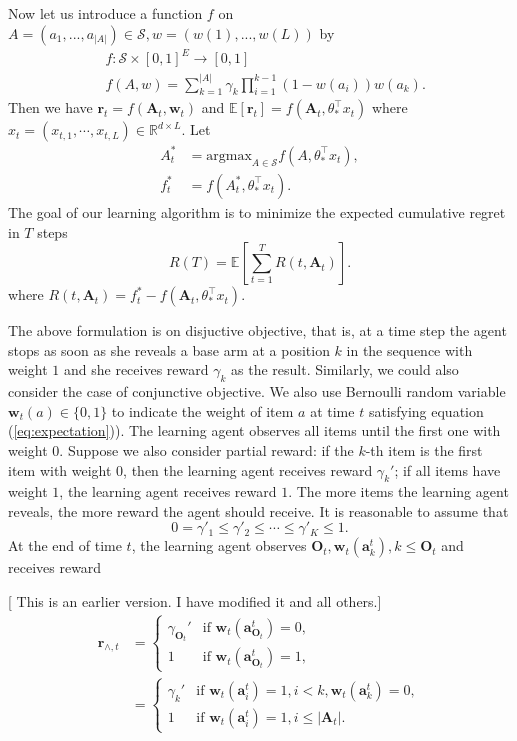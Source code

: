 \documentclass{article}
\newcommand{\EE}{\mathbb{E}}
\newcommand{\RR}{\mathbb{R}}
\newcommand{\bA}{\mathbf{A}}
\newcommand{\ba}{\mathbf{a}}
\newcommand{\bO}{\mathbf{O}}
\newcommand{\br}{\mathbf{r}}
\newcommand{\bw}{\mathbf{w}}
\newcommand{\cS}{\mathcal{S}}
\newcommand{\argmax}{\mathrm{argmax}}
\newcommand{\abs}[1]{\left| #1 \right|}
\newcommand{\wei}[1]{}
\newcommand{\wei}[1]{{\color{blue!50!black}  [\text{Wei:} #1]}}
\newcommand{\shuai}[1]{{\color{brown!60!black} [\text{Shuai:} #1]}}
\begin{document}
Now let us introduce a function $f$ on $A = (a_1,...,a_{\abs{A}}) \in \cS, w = (w(1),...,w(L))$ by
\begin{align*}
&f : \cS \times [0,1]^E \to [0,1]\\
&f(A,w) = \sum_{k = 1}^{\abs{A}} \gamma_{k} \prod_{i=1}^{k-1} (1 - w(a_i)) w(a_k).
\end{align*}
Then we have $\br_t = f(\bA_t, \bw_t)$ and $\EE[\br_t] = f(\bA_t, \theta_{\ast}^{\top}x_t)$ where $x_t = (x_{t,1}, \cdots, x_{t,L}) \in \RR^{d \times L}$. Let 
\begin{align*}
A_t^{\ast} &= \argmax_{A\in \cS} f(A,\theta_{\ast}^{\top}x_t),\\
f_t^{\ast} &= f(A_t^{\ast}, \theta_{\ast}^{\top}x_t).
\end{align*}
The goal of our learning algorithm is to minimize the expected cumulative regret in $T$ steps
$$
R(T) = \EE[\sum_{t=1}^T R(t, \bA_t)].
$$
where $R(t, \bA_t) = f_t^{\ast} - f(\bA_t, \theta_{\ast}^{\top}x_t)$.

The above formulation is on disjuctive objective, that is, at a time step the agent stops as soon as she reveals a base arm at a position $k$ in the sequence with weight $1$ and she receives reward $\gamma_k$ as the result. Similarly, we could also consider the case of conjunctive objective. We also use Bernoulli random variable $\bw_{t}(a) \in \{0,1\}$ to indicate the weight of item $a$ at time $t$ satisfying equation (\ref{eq:expectation})). The learning agent observes all items until the first one with weight $0$. Suppose we also consider partial reward: if the $k$-th item is the first item with weight $0$, then the learning agent receives reward $\gamma_k'$; if all items have weight $1$, the learning agent receives reward $1$. The more items the learning agent reveals, the more reward the agent should receive. It is reasonable to assume that
$$
0 = \gamma'_1 \leq \gamma'_2 \leq \cdots \leq \gamma'_K \leq 1.
$$
At the end of time $t$, the learning agent observes $\bO_t, \bw_t(\ba_k^t), k \leq \bO_t$ and receives reward
\wei{For the following, why using $\gamma_{\bO_t - 1}'$ and $\gamma_{k - 1}'$ instead of $\gamma_{\bO_t}'$ and $\gamma_{k}'$. It is inconsistent with the above description, and I think the latter makes sense.} 
\shuai{This is an earlier version. I have modified it and all others.}
\begin{align*}
\br_{\wedge, t} &= \begin{cases}
\gamma_{\bO_t}'  &\text{if } \bw_t(\ba_{\bO_t}^t) = 0,\\
1 &\text{if } \bw_t(\ba_{\bO_t}^t) = 1,
\end{cases}\\
&=\begin{cases}
\gamma_{k}'  &\text{if } \bw_t(\ba_{i}^t) = 1, i < k, \bw_t(\ba_{k}^t) = 0,\\
1 &\text{if } \bw_t(\ba_{i}^t) = 1, i\leq \abs{\bA_t}.
\end{cases}
\end{align*}
\end{document}
